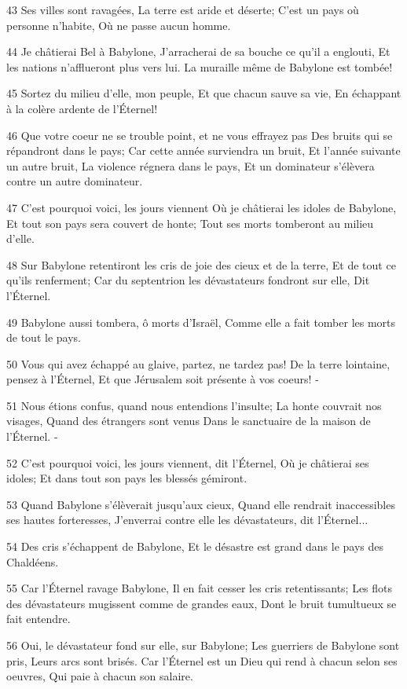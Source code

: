 \par 43 Ses villes sont ravagées, La terre est aride et déserte; C'est un pays où personne n'habite, Où ne passe aucun homme.
\par 44 Je châtierai Bel à Babylone, J'arracherai de sa bouche ce qu'il a englouti, Et les nations n'afflueront plus vers lui. La muraille même de Babylone est tombée!
\par 45 Sortez du milieu d'elle, mon peuple, Et que chacun sauve sa vie, En échappant à la colère ardente de l'Éternel!
\par 46 Que votre coeur ne se trouble point, et ne vous effrayez pas Des bruits qui se répandront dans le pays; Car cette année surviendra un bruit, Et l'année suivante un autre bruit, La violence régnera dans le pays, Et un dominateur s'élèvera contre un autre dominateur.
\par 47 C'est pourquoi voici, les jours viennent Où je châtierai les idoles de Babylone, Et tout son pays sera couvert de honte; Tout ses morts tomberont au milieu d'elle.
\par 48 Sur Babylone retentiront les cris de joie des cieux et de la terre, Et de tout ce qu'ils renferment; Car du septentrion les dévastateurs fondront sur elle, Dit l'Éternel.
\par 49 Babylone aussi tombera, ô morts d'Israël, Comme elle a fait tomber les morts de tout le pays.
\par 50 Vous qui avez échappé au glaive, partez, ne tardez pas! De la terre lointaine, pensez à l'Éternel, Et que Jérusalem soit présente à vos coeurs! -
\par 51 Nous étions confus, quand nous entendions l'insulte; La honte couvrait nos visages, Quand des étrangers sont venus Dans le sanctuaire de la maison de l'Éternel. -
\par 52 C'est pourquoi voici, les jours viennent, dit l'Éternel, Où je châtierai ses idoles; Et dans tout son pays les blessés gémiront.
\par 53 Quand Babylone s'élèverait jusqu'aux cieux, Quand elle rendrait inaccessibles ses hautes forteresses, J'enverrai contre elle les dévastateurs, dit l'Éternel...
\par 54 Des cris s'échappent de Babylone, Et le désastre est grand dans le pays des Chaldéens.
\par 55 Car l'Éternel ravage Babylone, Il en fait cesser les cris retentissants; Les flots des dévastateurs mugissent comme de grandes eaux, Dont le bruit tumultueux se fait entendre.
\par 56 Oui, le dévastateur fond sur elle, sur Babylone; Les guerriers de Babylone sont pris, Leurs arcs sont brisés. Car l'Éternel est un Dieu qui rend à chacun selon ses oeuvres, Qui paie à chacun son salaire.
